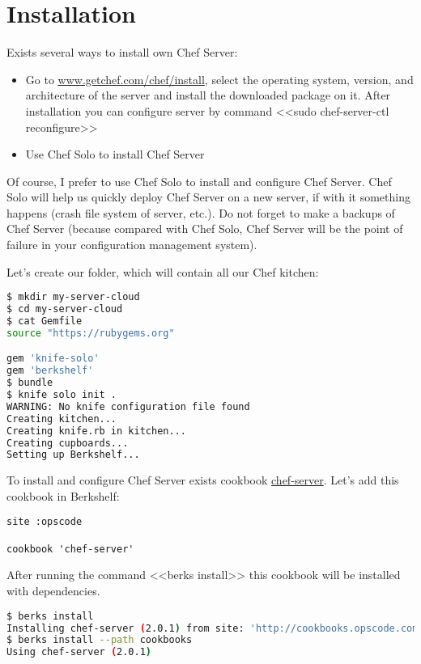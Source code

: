 \section{Installation}

Exists several ways to install own Chef Server:

\begin{itemize}
  \item Go to \href{http://www.getchef.com/chef/install/}{www.getchef.com/chef/install}, select the operating system, version, and architecture of the server and install the downloaded package on it. After installation you can configure server by command <<sudo chef-server-ctl reconfigure>>
  \item Use Chef Solo to install Chef Server
\end{itemize}

Of course, I prefer to use Chef Solo to install and configure Chef Server. Chef Solo will help us quickly deploy Chef Server on a new server, if with it something happens (crash file system of server, etc.). Do not forget to make a backups of Chef Server (because compared with Chef Solo, Chef Server will be the point of failure in your configuration management system).

Let's create our folder, which will contain all our Chef kitchen:

\begin{lstlisting}[language=Bash,label=lst:my-server-cloud-installation1]
$ mkdir my-server-cloud
$ cd my-server-cloud
$ cat Gemfile
source "https://rubygems.org"

gem 'knife-solo'
gem 'berkshelf'
$ bundle
$ knife solo init .
WARNING: No knife configuration file found
Creating kitchen...
Creating knife.rb in kitchen...
Creating cupboards...
Setting up Berkshelf...
\end{lstlisting}

To install and configure Chef Server exists cookbook \href{http://community.opscode.com/cookbooks/chef-server}{chef-server}. Let's add this cookbook in Berkshelf:

\begin{lstlisting}[label=lst:my-server-cloud-installation2,title=my-server-cloud/Berkshelf]
site :opscode

cookbook 'chef-server'
\end{lstlisting}

After running the command <<berks install>> this cookbook will be installed with dependencies.

\begin{lstlisting}[language=Bash,label=lst:my-server-cloud-installation3]
$ berks install
Installing chef-server (2.0.1) from site: 'http://cookbooks.opscode.com/api/v1/cookbooks'
$ berks install --path cookbooks
Using chef-server (2.0.1)
\end{lstlisting}

